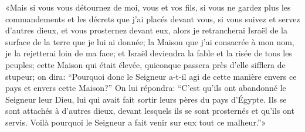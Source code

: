 «Mais si vous vous détournez de moi, vous et vos fils,
	si vous ne gardez plus les commandements et les décrets que j’ai placés devant vous,
	si vous suivez et servez d’autres dieux, et vous prosternez devant eux,
	alors je retrancherai Israël de la surface de la terre que je lui ai donnée;
	la Maison que j’ai consacrée à mon nom, je la rejetterai loin de ma face;
	et Israël deviendra la fable et la risée de tous les peuples;
	cette Maison qui était élevée, quiconque passera près d’elle sifflera de stupeur;
	on dira: “Pourquoi donc le Seigneur a-t-il agi de cette manière
		envers ce pays et envers cette Maison?”
On lui répondra: “C’est qu’ils ont abandonné le Seigneur leur Dieu,
	lui qui avait fait sortir leurs pères du pays d’Égypte.
Ils se sont attachés à d’autres dieux,
	devant lesquels ils se sont prosternés et qu’ils ont servis.
Voilà pourquoi le Seigneur a fait venir sur eux tout ce malheur.”»
